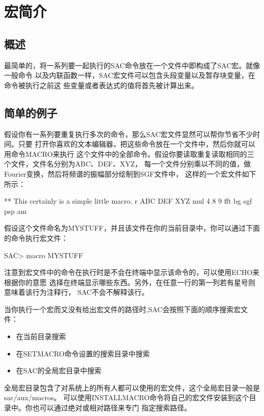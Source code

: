 \section{宏简介}
\label{sec:intro-to-macros}
\subsection{概述}
最简单的，将一系列要一起执行的SAC命令放在一个文件中即构成了SAC宏。就像一般命令
以及内联函数一样，SAC宏文件可以包含头段变量以及暂存块变量，在命令被执行之前这
些变量或者表达式的值将首先被计算出来。

\subsection{简单的例子}
假设你有一系列要重复执行多次的命令，那么SAC宏文件显然可以帮你节省不少时间。只要
打开你喜欢的文本编辑器，把这些命令放在一个文件中，然后你就可以用命令MACRO来执行
这个文件中的全部命令。假设你要读取重复读取相同的三个文件，文件名分别为ABC、DEF、XYZ，
每一个文件分别乘以不同的值，做Fourier变换，然后将频谱的振幅部分绘制到SGF文件中，
这样的一个宏文件如下所示：
\begin{SACCode}
  ** This certainly is a simple little macro.
  r ABC DEF XYZ
  mul 4 8 9
  fft
  bg sgf
  psp am
\end{SACCode}

假设这个文件命名为MYSTUFF，并且该文件在你的当前目录中，你可以通过下面的命令执行宏文件：
\begin{SACCode}
SAC> macro MYSTUFF
\end{SACCode}
注意到宏文件中的命令在执行时是不会在终端中显示该命令的，可以使用ECHO来根据你的意愿
选择在终端显示哪些东西。另外，在任意一行的第一列若有星号则意味着该行为注释行，
SAC不会不解释该行。

当你执行一个宏而又没有给出宏文件的路径时,SAC会按照下面的顺序搜索宏文件：
\begin{itemize}
\item 在当前目录搜索
\item 在SETMACRO命令设置的搜索目录中搜索
\item 在SAC的全局宏目录中搜索
\end{itemize}

全局宏目录包含了对系统上的所有人都可以使用的宏文件，这个全局宏目录一般是sac/aux/macros。
可以使用INSTALLMACRO命令将自己的宏文件安装到这个目录中。你也可以通过绝对或相对路径来专门
指定搜索路径。